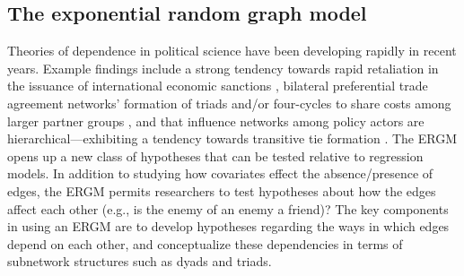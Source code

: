 \documentclass[fleqn,12pt]{wlscirep}
\begin{document}
\subsection{The exponential random graph model}

Theories of dependence in political science have been developing rapidly in recent years. Example findings include a strong tendency towards rapid retaliation in the issuance of international economic sanctions \citep{cranmer2014reciprocity}, bilateral preferential trade agreement networks' formation of triads and/or four-cycles to share costs among larger partner groups \citep{milewicz2018beyond}, and that influence networks among policy actors are hierarchical---exhibiting a tendency towards transitive tie formation \citep{christopoulos2015exceptional}.  The ERGM opens up a new class of hypotheses that can be tested relative to regression models. In addition to studying how covariates effect the absence/presence of edges, the ERGM permits researchers to test hypotheses about how the edges affect each other (e.g., is the enemy of an enemy a friend)? The key components in using an ERGM are to develop hypotheses regarding the ways in which edges depend on each other, and conceptualize these dependencies in terms of subnetwork structures such as dyads and triads.
\end{document}

